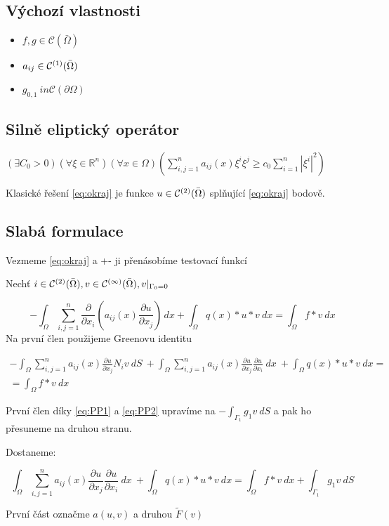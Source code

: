 \documentclass[../main.tex]{subfiles}
\begin{document}
\subsection{Výchozí vlastnosti}
\begin{itemize}
    \item $f, g \in \mathcal{C}(\bar{\Omega})$
    \item $a_{ij} \in \continuous[\bar{\Omega}]{1}$
    \item $g_{0,1} \ in \mathcal{C}(\partial\Omega)$
\end{itemize}


\subsection{Silně eliptický operátor}
$(\exists C_0 > 0)(\forall \xi \in \mathbb{R}^n) (\forall x \in \Omega) (\sum_{i,j =1}^{n} a_{ij}(x)\xi^i \xi^j \geq c_0 \sum_{i = 1}^{n}|\xi^i|^2)$


Klasické řešení \eqref{eq:okraj} je funkce $u\in\continuous[\bar{\Omega}]{2}$ splňující \eqref{eq:okraj} bodově. 

\subsection{Slabá formulace}
Vezmeme \eqref{eq:okraj} a +- ji přenásobíme testovací funkcí 

Nechť $i\in \closedcontinuous{2}, v\in\closedcontinuous{\infty}, v|_{\Gamma_0 = 0}$

\begin{equation}
    - \int_\Omega \sum_{i,j = 1}^{n} \frac{\partial}{\partial x_i} \left ( a_{ij}(x) \frac{\partial u}{\partial x_j}\right ) \, dx + \int_\Omega q(x)*u*v \ dx = \int_\Omega f*v \ dx 
\end{equation}
Na první člen použijeme Greenovu identitu

\begin{multline}
    - \int_\Omega \sum_{i,j = 1}^{n}a_{ij}(x) \frac{\partial u }{\partial x_j} N_i v \ dS \
    + \int_\Omega \sum_{i,j = 1}^{n}a_{ij}(x)\frac{\partial u }{\partial x_j}\frac{\partial u }{\partial x_i}\ dx \
    + \int_\Omega q(x)*u*v \ dx =\\= \int_\Omega f*v \ dx 
\end{multline}

První člen díky \eqref{eq:PP1} a \eqref{eq:PP2} upravíme na $- \int_{\Gamma_1} g_1 v \ dS$ a pak ho přesuneme na druhou stranu. 

Dostaneme: 

\begin{equation}
    \int_\Omega \sum_{i,j = 1}^{n}a_{ij}(x)\frac{\partial u }{\partial x_j}\frac{\partial u }{\partial x_i}\ dx \
    + \int_\Omega q(x)*u*v \ dx = \int_\Omega f*v \ dx + \int_{\Gamma_1} g_1 v \ dS
\end{equation}

První část označme $a(u,v)$ a druhou $\tilde{F}(v)$
\end{document}

